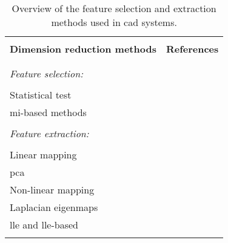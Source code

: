 \begin{table}
  \caption{Overview of the feature selection and extraction methods used in \ac{cad} systems.}\label{tab:featext}
  \small
  \renewcommand{\arraystretch}{.8}
  \begin{tabular}{p{.65\linewidth} p{.25\linewidth}}
    \hline \\ [-1.5ex]
    \textbf{Dimension reduction methods} & \textbf{References} \\ \\ [-1.5ex]
    \hline \\ [-1.5ex]
    \textit{Feature selection:} & \\ \\ [-1.5ex]
    \quad Statistical test & \cite{Niaf2011,Niaf2012,Vos2012} \\
    \quad \ac{mi}-based methods & \cite{Niaf2011,Niaf2012,Vos2008} \\ \\ [-1.5ex]
    \textit{Feature extraction:} & \\ \\ [-1.5ex]
    \quad Linear mapping & \\
    \quad \quad \acs{pca} & \cite{Tiwari2008,Tiwari2009} \\
    \quad Non-linear mapping & \\
    \quad \quad Laplacian eigenmaps & \cite{Tiwari2007,Tiwari2009a,Tiwari2009,Tiwari2010,Viswanath2008,Viswanath2011} \\
    \quad \quad \acs{lle} and \acs{lle}-based & \cite{Tiwari2008,Tiwari2009,Viswanath2008a,Viswanath2008} \\ \\ [-1.5ex]
    \hline
  \end{tabular}
\end{table} 

